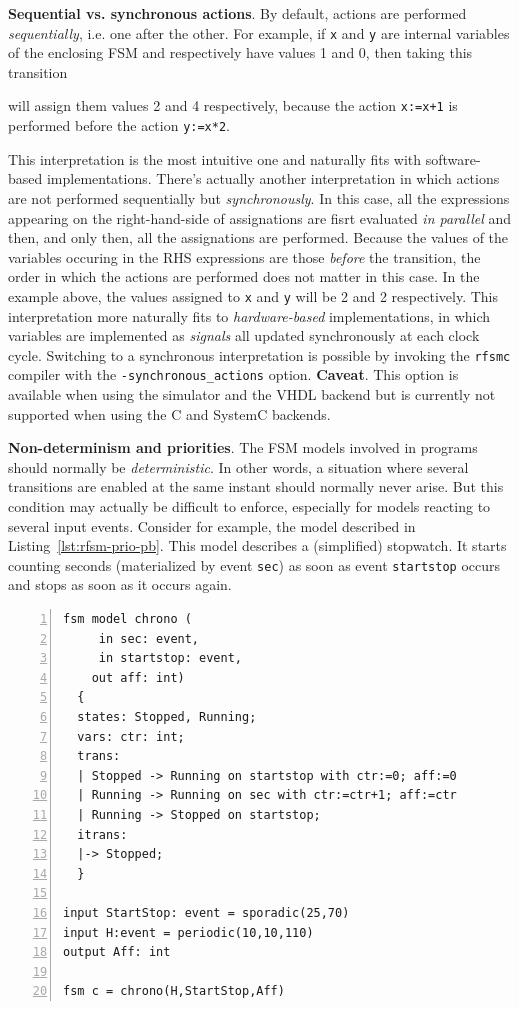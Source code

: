 \textbf{Sequential vs. synchronous actions}.
By default, actions are performed  \emph{sequentially}, i.e. one after the other. 
For example, if \verb|x| and \verb|y| are internal variables of the enclosing FSM and respectively
have values 1 and 0, then taking this transition

\begin{center}
\end{center}

will assign them values 2 and 4 respectively, because the action \verb|x:=x+1| is performed before
the action \verb|y:=x*2|. 

This interpretation is the most intuitive one and naturally fits with software-based
implementations. There's actually another interpretation in which actions are not performed sequentially but
\emph{synchronously}. In this case, all the expressions appearing on the right-hand-side of
assignations are fisrt evaluated \emph{in parallel} and then, and only then, all the assignations
are performed. Because the values of the variables occuring in the RHS expressions are those 
\emph{before} the transition, the order in which the actions are performed does not matter in this
case. In the example above, the values assigned to \texttt{x} and \texttt{y} will be 2 and 2
  respectively. This interpretation more naturally fits to \emph{hardware-based} implementations,
in which variables are implemented as \emph{signals} all updated synchronously at each clock cycle. 
Switching to a synchronous interpretation is possible by invoking the \texttt{rfsmc} compiler with the
\texttt{-synchronous_actions} option. \textbf{Caveat}. This option is
available when using the simulator and the VHDL backend but is
currently not supported when using the C and SystemC backends.

\medskip
\textbf{Non-determinism and priorities}. 
The FSM models involved in programs should normally be \emph{deterministic}. In other words, a
situation where several transitions are enabled at the same instant should normally never arise. But
this condition may actually be difficult to enforce, especially for models reacting to several input
events. Consider for example, the model described in Listing~\ref{lst:rfsm-prio-pb}. This model
describes a (simplified) stopwatch. It starts counting seconds (materialized by event \verb|sec|)
as soon as event \verb|startstop| occurs and stops as soon as it occurs again.

\begin{lstlisting}[language=Rfsm,frame=single,numbers=left,caption=A program showing a potentially non-deterministic
  model,label={lst:rfsm-prio-pb},float]
fsm model chrono (
     in sec: event,
     in startstop: event,
    out aff: int)
  {
  states: Stopped, Running;
  vars: ctr: int;
  trans:
  | Stopped -> Running on startstop with ctr:=0; aff:=0
  | Running -> Running on sec with ctr:=ctr+1; aff:=ctr
  | Running -> Stopped on startstop;
  itrans:
  |-> Stopped;
  }

input StartStop: event = sporadic(25,70)
input H:event = periodic(10,10,110)
output Aff: int

fsm c = chrono(H,StartStop,Aff)
\end{lstlisting}


